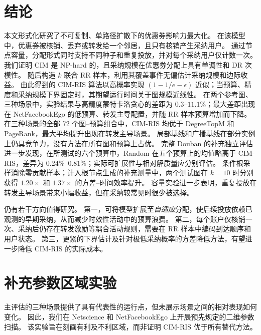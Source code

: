 \documentclass[sigconf,balance=false]{acmart}
\newcommand{\CIMRIS}{\textsc{CIM-RIS}}
\begin{document}
\section{结论}
\label{sec:conclusion}

本文形式化研究了不可复制、单路径扩散下的优惠券影响力最大化。
在该模型中，优惠券被核销、丢弃或转发给一个邻居，且只有核销产生采纳用户。
通过节点容量，分配形式同时支持不同种子和重复投放，并对每个采纳用户仅计数一次。
我们证明 CIM 是 NP-hard 的，且采纳规模在优惠券分配上具有单调性和 DR 次模性。
随后构造 $k$ 联合 RR 样本，利用其覆盖事件无偏估计采纳规模和边际收益。
由此得到的 \CIMRIS{} 算法以高概率实现 $(1-1/e-\epsilon)$ 近似；当预算、精度和采纳规模下界固定时，其期望运行时间关于图规模近线性。
在两个参考图、三种场景中，实验结果与高精度蒙特卡洛贪心的差距为 $0.3$--$11.1\%$；最大差距出现在 NetFacebookEgo 的低预算、转发主导配置，并随 RR 样本预算增加而下降。
在三种场景的全部 72 个图--预算组合中，\CIMRIS{} 均优于 DegreeTopM 和 PageRank，最大平均提升出现在转发主导场景。
局部基线和广播基线在部分实例上仍具竞争力，没有方法在所有图和预算上占优。
完整 Douban 的补充独立评估进一步发现，在所测试的六个预算中，Random 在五个预算上的均值略高于 \CIMRIS{}，差异为 $0.24\%$--$0.81\%$；实际可扩展性与相对解质量应分别评估。
条件根采样消除零贡献样本；计入根节点生成的补充测量中，两个测试图在 $k=10$ 时分别获得 $1.20\times$ 和 $1.37\times$ 的方差--时间效率提升。
容量实验进一步表明，重复投放在转发主导场景带来小幅收益，但在采纳较常见时很少被选择。

仍有若干方向值得研究。
第一，可将模型扩展至\emph{自适应}分配，使后续投放依赖已观测的早期采纳，从而减少时效性活动中的预算浪费。
第二，每个账户仅核销一次、采纳后仍存在转发激励等耦合活动规则，需要在 RR 样本中编码到达顺序和用户状态。
第三，更紧的下界估计及针对极低采纳概率的方差降低方法，有望进一步降低 \CIMRIS{} 的实际成本。

\appendix
\section{补充参数区域实验}
\label{app:parameter-sweep}

主评估的三种场景提供了具有代表性的运行点，但未展示场景之间的相对表现如何变化。
因此，我们在 Netscience 和 NetFacebookEgo 上开展预先规定的二维参数扫描。
该实验旨在刻画有利及不利区域，而非证明 \CIMRIS{} 优于所有替代方法。
\end{document}
